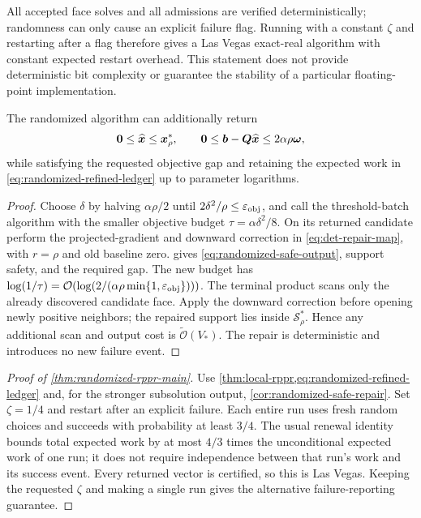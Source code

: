 \begin{remark}
\label{rem:las-vegas-scope}
All accepted face solves and all admissions are verified deterministically;
randomness can only cause an explicit failure flag.  Running with a constant
$\zeta$ and restarting after a flag therefore gives a Las Vegas exact-real
algorithm with constant expected restart overhead.  This statement does not
provide deterministic bit complexity or guarantee the stability of a
particular floating-point implementation.
\end{remark}

\begin{corollary}
\label{cor:randomized-safe-repair}
The randomized algorithm can additionally return
\begin{equation}
 \bm{0}\leq\widehat{\bm{x}}\leq\bm{x}_\rho^*,\qquad
 \bm{0}\leq\bm{b}-\bm{Q}\widehat{\bm{x}}\leq2\alpha\rho\bm{\omega},
 \label{eq:randomized-safe-output}
\end{equation}
while satisfying the requested objective gap and retaining the expected
work in \cref{eq:randomized-refined-ledger} up to parameter logarithms.
\end{corollary}
\begin{proof}
Choose $\delta$ by halving $\alpha\rho/2$ until
$2\delta^2/\rho\leq\varepsilon_{\mathrm{obj}}$, and call the threshold-batch algorithm
with the smaller objective budget $\tau=\alpha\delta^2/8$.
On its returned candidate perform the projected-gradient and downward
correction in \cref{eq:det-repair-map}, with $r=\rho$ and old baseline
zero.  gives
\cref{eq:randomized-safe-output}, support safety, and the required gap.
The new budget has
$\log(1/\tau)=\mathcal{O}(\log(2/(\alpha\rho\min\{1,\varepsilon_{\mathrm{obj}}\})))$.
The terminal product scans only the already discovered candidate face.
Apply the downward correction before opening newly positive neighbors;
the repaired support lies inside $\mathcal S_\rho^*$.
Hence any additional scan and output cost is $\widetilde{\mathcal{O}}(V_*)$.
The repair is deterministic and introduces no new failure event.
\end{proof}

\begin{proof}[Proof of \cref{thm:randomized-rppr-main}]
Use \cref{thm:local-rppr,eq:randomized-refined-ledger} and, for the stronger
subsolution output, \cref{cor:randomized-safe-repair}.
Set $\zeta=1/4$ and restart after an explicit failure. Each entire run
uses fresh random choices and succeeds with probability at least $3/4$.
The usual renewal identity bounds total expected work by at most $4/3$
times the unconditional expected work of one run; it does not require
independence between that run's work and its success event. Every returned
vector is certified, so this is Las Vegas. Keeping the requested $\zeta$
and making a single run gives the alternative failure-reporting guarantee.
\end{proof}
